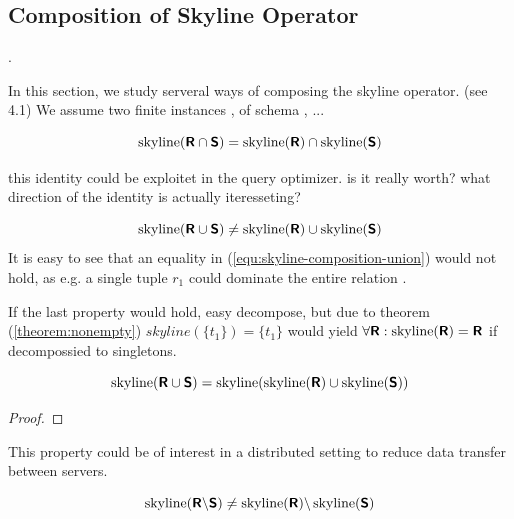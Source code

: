 \subsection{Composition of Skyline Operator}
 .


In this section, we study serveral ways of composing the skyline operator. (see \citep{Chomicki2002} 4.1)
We assume two finite instances ,  of schema , ...

\begin{equation}
\skyline(\relation{R} \intersection \relation{S}) = \skyline(\relation{R}) \intersection \skyline(\relation{S})
\end{equation}

this identity could be exploitet in the query optimizer. 
is it really worth? what direction of the identity is actually iteresseting?

\begin{equation}\label{equ:skyline-composition-union}
\skyline(\relation{R} \union \relation{S}) \not= \skyline(\relation{R}) \union \skyline(\relation{S})
\end{equation}
It is easy to see that an equality in (\ref{equ:skyline-composition-union}) would not hold, as e.g. a single tuple $r_1$ could dominate the entire relation .

If the last property would hold, easy decompose, but due to theorem (\ref{theorem:nonempty}) $skyline(\{t_1\}) = \{t_1\}$ would yield $\forall \relation{R} : \skyline(\relation{R}) = \relation{R}$ if decompossied to singletons.

\begin{equation}\label{equ:skyline-decompose}
\skyline(\relation{R} \union \relation{S}) = \skyline(\skyline(\relation R) \union \skyline(\relation S))
\end{equation}
\begin{proof}
\end{proof}

This property could be of interest in a distributed setting to reduce data transfer between servers.


\begin{equation}
\skyline(\relation{R} \difference \relation{S}) \not= \skyline(\relation{R}) \difference \skyline(\relation{S})
\end{equation}

